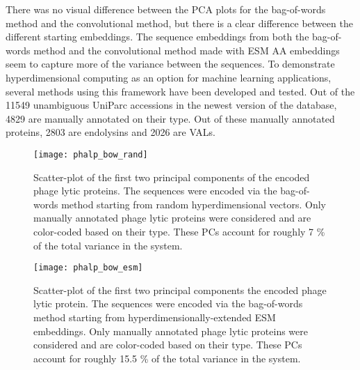 There was no visual difference between the PCA plots for the bag-of-words method and the convolutional method, but there is a clear difference between the different starting embeddings. The sequence embeddings from both the bag-of-words method and the convolutional method made with ESM AA embeddings seem to capture more of the variance between the sequences. To demonstrate hyperdimensional computing as an option for machine learning applications, several methods using this framework have been developed and tested. Out of the 11549 unambiguous UniParc accessions in the newest version of the database, 4829 are manually annotated on their type. Out of these manually annotated proteins, 2803 are endolysins and 2026 are VALs.

\begin{figure}[H]
    \centering
    \texttt{[image: phalp\_bow\_rand]}
    \caption{Scatter-plot of the first two principal components of the encoded phage lytic proteins. The sequences were encoded via the bag-of-words method starting from random hyperdimensional vectors. Only manually annotated phage lytic proteins were considered and are color-coded based on their type. These PCs account for roughly 7 \% of the total variance in the system.}
    \label{fig:phalpbowrand}
\end{figure}

\begin{figure}[H]
    \centering
    \texttt{[image: phalp\_bow\_esm]}
    \caption{Scatter-plot of the first two principal components the encoded phage lytic protein. The sequences were encoded via the bag-of-words method starting from hyperdimensionally-extended ESM embeddings. Only manually annotated phage lytic proteins were considered and are color-coded based on their type. These PCs account for roughly 15.5 \% of the total variance in the system.}
    \label{fig:phalpbowesm}
\end{figure}


